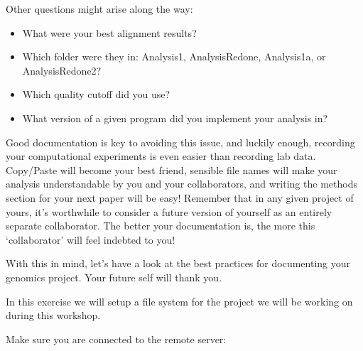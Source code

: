 \documentclass[
  letterpaper,
  DIV=11,
  numbers=noendperiod]{scrreprt}
\newenvironment{Shaded}{\begin{snugshade}}{\end{snugshade}}
\newcommand{\ExtensionTok}[1]{\textcolor[rgb]{0.00,0.23,0.31}{#1}}
\newcommand{\NormalTok}[1]{\textcolor[rgb]{0.00,0.23,0.31}{#1}}
\newcommand{\PreprocessorTok}[1]{\textcolor[rgb]{0.68,0.00,0.00}{#1}}
\newcommand{\SpecialStringTok}[1]{\textcolor[rgb]{0.13,0.47,0.30}{#1}}
\begin{document}
Other questions might arise along the way:

\begin{itemize}
\item
  What were your best alignment results?
\item
  Which folder were they in: Analysis1, AnalysisRedone, Analysis1a, or
  AnalysisRedone2?
\item
  Which quality cutoff did you use?
\item
  What version of a given program did you implement your analysis in?
\end{itemize}

Good documentation is key to avoiding this issue, and luckily enough,
recording your computational experiments is even easier than recording
lab data. Copy/Paste will become your best friend, sensible file names
will make your analysis understandable by you and your collaborators,
and writing the methods section for your next paper will be easy!
Remember that in any given project of yours, it's worthwhile to consider
a future version of yourself as an entirely separate collaborator. The
better your documentation is, the more this `collaborator' will feel
indebted to you!

With this in mind, let's have a look at the best practices for
documenting your genomics project. Your future self will thank you.

In this exercise we will setup a file system for the project we will be
working on during this workshop.

\begin{tcolorbox}[enhanced jigsaw, opacitybacktitle=0.6, colback=white, coltitle=black, opacityback=0, rightrule=.15mm, toptitle=1mm, toprule=.15mm, bottomtitle=1mm, colframe=quarto-callout-warning-color-frame, arc=.35mm, titlerule=0mm, colbacktitle=quarto-callout-warning-color!10!white, leftrule=.75mm, title=\textcolor{quarto-callout-warning-color}{\faExclamationTriangle}\hspace{0.5em}{Warning}, breakable, bottomrule=.15mm, left=2mm]

Make sure you are connected to the remote server:

\begin{Shaded}
\end{Shaded}

\end{tcolorbox}
\end{document}
